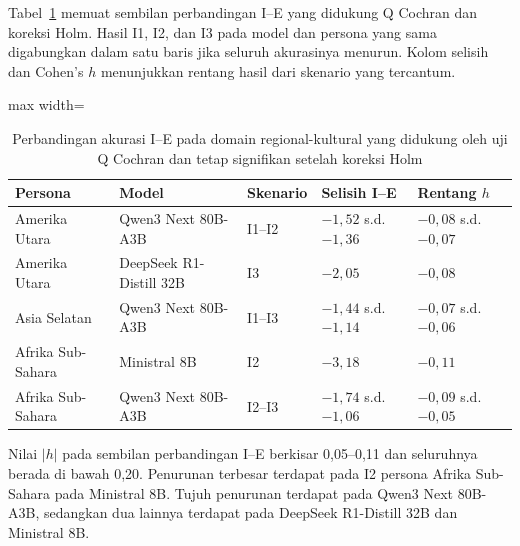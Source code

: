 Tabel~\ref{tab:hasil-signifikan-regional-gsm8k} memuat sembilan perbandingan
I--E yang didukung Q Cochran dan koreksi Holm. Hasil I1, I2, dan I3 pada model
dan persona yang sama digabungkan dalam satu baris jika seluruh akurasinya
menurun. Kolom selisih dan Cohen's $h$ menunjukkan rentang hasil dari skenario
yang tercantum.

\begin{table}[H]
    \centering
    \caption[Perbandingan akurasi I--E pada domain regional-kultural]
    {Perbandingan akurasi I--E pada domain regional-kultural yang didukung oleh
    uji Q Cochran dan tetap signifikan setelah koreksi Holm}
    \label{tab:hasil-signifikan-regional-gsm8k}
    \footnotesize
    \renewcommand{\arraystretch}{1.15}
    \begin{adjustbox}{max width=\textwidth}
    \begin{tabular}{
        >{\raggedright\arraybackslash}p{2.4cm}
        >{\raggedright\arraybackslash}p{3.4cm}
        >{\centering\arraybackslash}p{1.3cm}
        >{\centering\arraybackslash}p{2.6cm}
        >{\centering\arraybackslash}p{2.2cm}}
        \toprule
        \textbf{Persona} & \textbf{Model} & \textbf{Skenario} &
        \textbf{Selisih I--E} & \textbf{Rentang $h$} \\
        \midrule
        Amerika Utara & Qwen3 Next 80B-A3B & I1--I2 &
        $-1{,}52$ s.d. $-1{,}36$ & $-0{,}08$ s.d. $-0{,}07$ \\
        Amerika Utara & DeepSeek R1-Distill 32B & I3 &
        $-2{,}05$ & $-0{,}08$ \\
        Asia Selatan & Qwen3 Next 80B-A3B & I1--I3 &
        $-1{,}44$ s.d. $-1{,}14$ & $-0{,}07$ s.d. $-0{,}06$ \\
        Afrika Sub-Sahara & Ministral 8B & I2 &
        $-3{,}18$ & $-0{,}11$ \\
        Afrika Sub-Sahara & Qwen3 Next 80B-A3B & I2--I3 &
        $-1{,}74$ s.d. $-1{,}06$ & $-0{,}09$ s.d. $-0{,}05$ \\
        \bottomrule
    \end{tabular}
    \end{adjustbox}
\end{table}

Nilai $|h|$ pada sembilan perbandingan I--E berkisar 0,05--0,11 dan seluruhnya
berada di bawah 0,20. Penurunan terbesar terdapat pada I2 persona Afrika
Sub-Sahara pada Ministral 8B. Tujuh penurunan terdapat pada Qwen3 Next
80B-A3B, sedangkan dua lainnya terdapat pada DeepSeek R1-Distill 32B dan
Ministral 8B.



